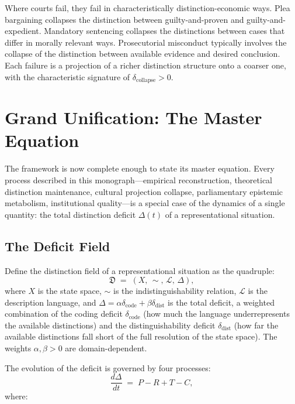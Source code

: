 \documentclass[12pt, letterpaper]{article}
\theoremstyle{remark}
\newcommand{\Dc}{\delta_{\mathrm{code}}}
\newcommand{\Dd}{\delta_{\mathrm{dist}}}
\begin{document}
Where courts fail, they fail in characteristically distinction-economic ways.
Plea bargaining collapses the distinction between guilty-and-proven and
guilty-and-expedient.  Mandatory sentencing collapses the distinctions between
cases that differ in morally relevant ways.  Prosecutorial misconduct
typically involves the collapse of the distinction between available evidence
and desired conclusion.  Each failure is a projection of a richer distinction
structure onto a coarser one, with the characteristic signature of
$\delta_{\text{collapse}} > 0$.

\section{Grand Unification: The Master Equation}

The framework is now complete enough to state its master equation.  Every
process described in this monograph---empirical reconstruction, theoretical
distinction maintenance, cultural projection collapse, parliamentary
epistemic metabolism, institutional quality---is a special case of the
dynamics of a single quantity: the total distinction deficit $\Delta(t)$ of
a representational situation.

\subsection{The Deficit Field}

Define the distinction field of a representational situation as the
quadruple:
\begin{equation}
  \mathfrak{D} \;=\; (X,\, {\sim},\, \mathcal{L},\, \Delta),
\end{equation}
where $X$ is the state space, ${\sim}$ is the indistinguishability relation,
$\mathcal{L}$ is the description language, and $\Delta = \alpha\Dc + \beta\Dd$
is the total deficit, a weighted combination of the coding deficit $\Dc$
(how much the language underrepresents the available distinctions) and the
distinguishability deficit $\Dd$ (how far the available distinctions fall
short of the full resolution of the state space).  The weights $\alpha, \beta
> 0$ are domain-dependent.

The evolution of the deficit is governed by four processes:
\begin{equation}
  \frac{d\Delta}{dt}
  \;=\;
  P - R + T - C,
  \label{eq:master}
\end{equation}
where:
\end{document}
